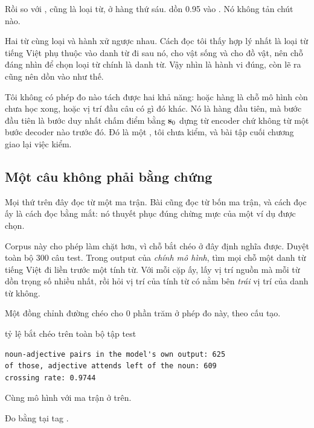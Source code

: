 %
Rồi so  với , cũng là loại từ, ở hàng thứ sáu. 
dồn 0.95 vào . Nó không tản chút nào.

Hai từ cùng loại và hành xử ngược nhau. Cách đọc tôi thấy hợp lý nhất là loại
từ tiếng Việt phụ thuộc vào danh từ đi sau nó,  cho vật sống và
 cho đồ vật, nên chỗ đáng nhìn để chọn loại từ chính là danh từ. Vậy
 nhìn  là hành vi đúng, còn  lẽ ra cũng nên dồn
vào  như thế.

Tôi không có phép đo nào tách được hai khả năng: hoặc hàng  là chỗ mô
hình còn chưa học xong, hoặc vị trí đầu câu có gì đó khác. Nó là hàng đầu tiên,
mà bước đầu tiên là bước duy nhất chấm điểm bằng \(\mathbf{s}_0\) dựng từ
encoder chứ không từ một bước decoder nào trước đó. Đó là một
, tôi chưa kiểm, và bài tập cuối chương giao lại
việc kiểm.

\subsection*{Một câu không phải bằng chứng}

%
Mọi thứ trên đây đọc từ một ma trận. Bài cũng đọc từ bốn ma trận, và cách đọc
ấy là cách đọc bằng mắt: nó thuyết phục đúng chừng mực của một ví dụ được chọn.

Corpus này cho phép làm chặt hơn, vì chỗ bắt chéo ở đây định nghĩa được. Duyệt
toàn bộ 300 câu test. Trong output của \emph{chính mô hình}, tìm mọi chỗ một
danh từ tiếng Việt đi liền trước một tính từ. Với mỗi cặp ấy, lấy vị trí nguồn
mà mỗi từ dồn trọng số nhiều nhất, rồi hỏi vị trí của tính từ có nằm bên
\emph{trái} vị trí của danh từ không.

Một đồng chỉnh đường chéo cho 0 phần trăm ở phép đo này, theo cấu tạo.

\begin{measured}{tỷ lệ bắt chéo trên toàn bộ tập test}
\begin{verbatim}
noun-adjective pairs in the model's own output: 625
of those, adjective attends left of the noun: 609
crossing rate: 0.9744
\end{verbatim}

Cùng mô hình với ma trận ở trên.

Đo bằng  tại tag .
\end{measured}

